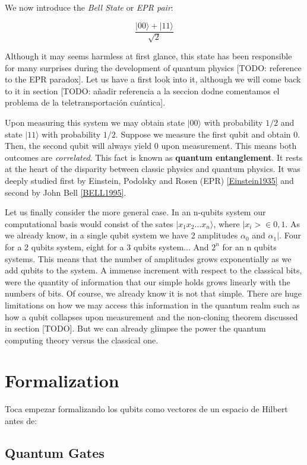 We now introduce the \emph{Bell State} or \emph{EPR pair}:

$$ \frac{ |00\rangle + |11\rangle }{ \sqrt 2 } $$

Although it may seems harmless at first glance, this state has been responsible for many surprises during the development of quantum physics [TODO: reference to the EPR paradox]. Let us have a first look into it, although we will come back to it in section [TODO: añadir referencia a la seccion dodne comentamos el problema de la teletransportación cuántica].

Upon measuring this system we may obtain state $|00\rangle$ with probability $1/2$ and state $|11\rangle$ with probability $1/2$. Suppose we measure the first qubit and obtain 0. Then, the second qubit will always yield 0 upon measurement. This means both outcomes are \emph{correlated}. This fact is known as \textbf{quantum entanglement}. It rests at the heart of the disparity between classic physics and quantum physics. It was deeply studied first by Einstein, Podolsky and Rosen (EPR) \ref{Einstein1935} and second by John Bell \ref{BELL1995}.

Let us finally consider the more general case. In an n-qubits system our computational basis would consist of the sates $|x_1 x_2 \dotsc x_n\rangle$, where $|x_i> \in {0,1}$. As we already know, in a single qubit system we have 2 amplitudes $\alpha_0$ and $\alpha_1|$. Four for a 2 qubits system, eight for a 3 qubits system... And $2^n$ for an n qubits systems. This means that the number of amplitudes grows exponentially as we add qubits to the system. A immense increment with respect to the classical bits, were the quantity of information that our simple holds grows linearly with the numbers of bits. Of course, we already know it is not that simple. There are huge limitations on how we may access this information in the quantum realm such as how a qubit collapses upon measurement and the non-cloning theorem discussed in section [TODO]. But we can already glimpse the power the quantum computing theory versus the classical one.

\section{Formalization }

Toca empezar formalizando los qubits como vectores de un espacio de Hilbert antes de:


\subsection{Quantum Gates}

